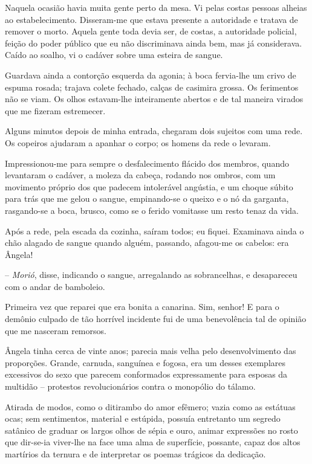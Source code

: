 Naquela ocasião havia muita gente perto da
mesa. Vi pelas costas pessoas alheias ao estabelecimento. Disseram{}-me
que estava presente a autoridade e tratava de remover o morto. Aquela
gente toda devia ser, de costas, a autoridade policial, feição do poder
público que eu não discriminava ainda bem, mas já considerava. Caído ao
soalho, vi o cadáver sobre uma esteira de sangue. 

Guardava ainda a
contorção esquerda da agonia; à boca fervia{}-lhe um crivo de espuma
rosada; trajava colete fechado, calças de casimira grossa. Os
ferimentos não se viam. Os olhos estavam{}-lhe inteiramente abertos e
de tal maneira virados que me fizeram estremecer. 

Alguns minutos depois
de minha entrada, chegaram dois sujeitos com uma rede. Os copeiros
ajudaram a apanhar o corpo; os homens da rede o levaram.

Impressionou{}-me para sempre o desfalecimento flácido dos membros,
quando levantaram o cadáver, a moleza da cabeça, rodando nos ombros,
com um movimento próprio dos que padecem intolerável angústia, e um
choque súbito para trás que me gelou o sangue, empinando{}-se o queixo
e o nó da garganta, rasgando{}-se a boca, brusco, como se o ferido
vomitasse um resto tenaz da vida. 

Após a rede, pela escada da cozinha,
saíram todos; eu fiquei. Examinava ainda o chão alagado de sangue
quando alguém, passando, afagou{}-me os cabelos: era Ângela! 

-- \textit{Morió}, disse, indicando o sangue, arregalando as sobrancelhas, e desapareceu
com o andar de bamboleio. 

Primeira vez que reparei que era bonita a
canarina. Sim, senhor! E para o demônio culpado de tão horrível
incidente fui de uma benevolência tal de opinião que me nasceram
remorsos. 

Ângela tinha cerca de vinte anos; parecia mais velha pelo
desenvolvimento das proporções. Grande, carnuda, sanguínea e fogosa,
era um desses exemplares excessivos do sexo que parecem conformados
expressamente para esposas da multidão -- protestos revolucionários
contra o monopólio do tálamo. 

Atirada de modos, como o ditirambo do
amor efêmero; vazia como as estátuas ocas; sem sentimentos, material e
estúpida, possuía entretanto um segredo satânico de graduar os largos
olhos de sépia e ouro, animar expressões no rosto que dir{}-se{}-ia
viver{}-lhe na face uma alma de superfície, possante, capaz dos altos
martírios da ternura e de interpretar os poemas trágicos da dedicação.

